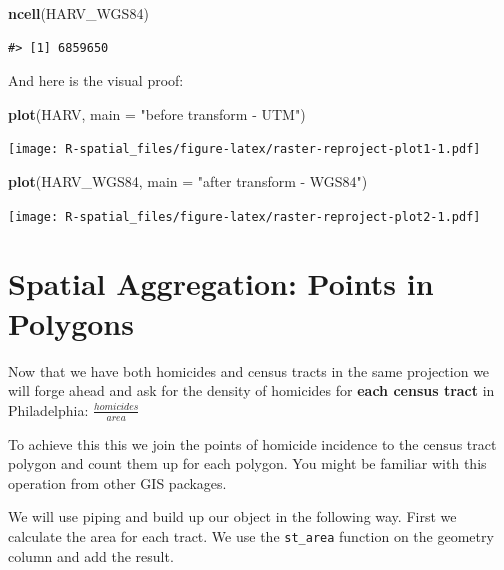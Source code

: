 \documentclass[
]{book}
\newenvironment{Shaded}{\begin{snugshade}}{\end{snugshade}}
\newcommand{\AttributeTok}[1]{\textcolor[rgb]{0.13,0.29,0.53}{#1}}
\newcommand{\FunctionTok}[1]{\textcolor[rgb]{0.13,0.29,0.53}{\textbf{#1}}}
\newcommand{\NormalTok}[1]{#1}
\newcommand{\StringTok}[1]{\textcolor[rgb]{0.31,0.60,0.02}{#1}}
\begin{document}
\begin{Shaded}
\begin{Highlighting}[]
\FunctionTok{ncell}\NormalTok{(HARV\_WGS84)}
\end{Highlighting}
\end{Shaded}

\begin{verbatim}
#> [1] 6859650
\end{verbatim}

And here is the visual proof:

\begin{Shaded}
\begin{Highlighting}[]
\FunctionTok{plot}\NormalTok{(HARV, }\AttributeTok{main =} \StringTok{"before transform {-} UTM"}\NormalTok{)}
\end{Highlighting}
\end{Shaded}

\texttt{[image: R-spatial\_files/figure-latex/raster-reproject-plot1-1.pdf]}

\begin{Shaded}
\begin{Highlighting}[]
\FunctionTok{plot}\NormalTok{(HARV\_WGS84, }\AttributeTok{main =} \StringTok{"after transform {-} WGS84"}\NormalTok{)}
\end{Highlighting}
\end{Shaded}

\texttt{[image: R-spatial\_files/figure-latex/raster-reproject-plot2-1.pdf]}

\hypertarget{spatial-aggregation-points-in-polygons}{%
\section{Spatial Aggregation: Points in Polygons}\label{spatial-aggregation-points-in-polygons}}

Now that we have both homicides and census tracts in the same projection we will forge ahead and ask for the density of homicides for \textbf{each census tract} in Philadelphia: \(\frac{{homicides}}{area}\)

To achieve this this we join the points of homicide incidence to the census tract polygon and count them up for each polygon. You might be familiar with this operation from other GIS packages.

We will use piping and build up our object in the following way. First we calculate the area for each tract. We use the \texttt{st\_area} function on the geometry column and add the result.
\end{document}
